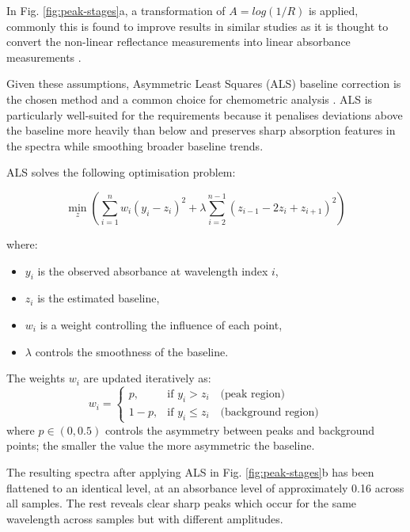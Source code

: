 \documentclass[conference]{IEEEtran}
\begin{document}
In Fig. \ref{fig:peak-stages}a, a transformation of $A = log(1/R)$ is applied, commonly this is found to improve results in similar studies as it is thought to convert the non-linear reflectance measurements into linear absorbance measurements \cite{min2005determination}.
  
Given these assumptions, Asymmetric Least Squares (ALS) baseline correction is the chosen method and a common choice for chemometric analysis \cite{FengZhang2020}. ALS is particularly well-suited for the requirements because it penalises deviations above the baseline more heavily than below and preserves sharp absorption features in the spectra while smoothing broader baseline trends.

ALS solves the following optimisation problem:

\begin{equation}
\min_{z} \left( \sum_{i=1}^{n} w_i (y_i - z_i)^2 + \lambda \sum_{i=2}^{n-1} (z_{i-1} - 2z_i + z_{i+1})^2 \right) \label{eq3}
\end{equation}


where:
\begin{itemize}
    \item \( y_i \) is the observed absorbance at wavelength index \( i \),
    \item \( z_i \) is the estimated baseline,
    \item \( w_i \) is a weight controlling the influence of each point,
    \item \( \lambda \) controls the smoothness of the baseline.
\end{itemize}

The weights \( w_i \) are updated iteratively as:
\begin{equation}
w_i = 
\begin{cases}
p, & \text{if } y_i > z_i \quad \text{(peak region)} \\
1 - p, & \text{if } y_i \leq z_i \quad \text{(background region)}
\end{cases} \label{eq4}
\end{equation}
where \( p \in (0, 0.5) \) controls the asymmetry between peaks and background points; the smaller the value the more asymmetric  the baseline.

\vspace{0.1cm}
  
The resulting spectra after applying ALS in Fig. \ref{fig:peak-stages}b has been flattened to an identical level, at an absorbance level of approximately 0.16 across all samples. The rest reveals clear sharp peaks which occur for the same wavelength across samples but with different amplitudes.
\end{document}
